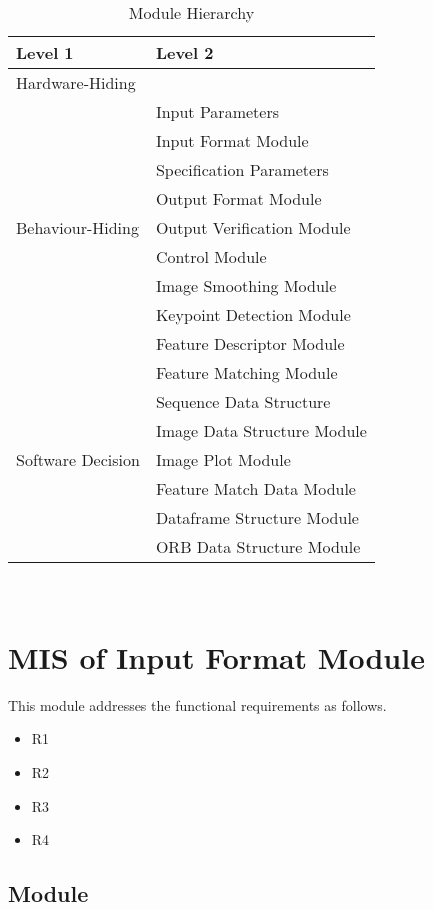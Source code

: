 \documentclass[12pt, titlepage]{article}
\begin{document}
\begin{table}[h!]
\centering
\begin{tabular}{p{} p{}}
\toprule
\textbf{Level 1} & \textbf{Level 2}\\
\midrule

{Hardware-Hiding} & ~ \\
\midrule

\multirow{9}{0.3\textwidth}{Behaviour-Hiding} & Input Parameters\\
& Input Format Module \\
& Specification Parameters \\
& Output Format Module \\
& Output Verification Module \\
& Control Module \\
& Image Smoothing Module \\
& Keypoint Detection Module \\
& Feature Descriptor Module \\
& Feature Matching Module \\
\midrule

\multirow{5}{0.3\textwidth}{Software Decision} & {Sequence Data Structure}\\
& Image Data Structure Module \\
& Image Plot Module \\
& Feature Match Data Module \\
& Dataframe Structure Module \\
& ORB Data Structure Module \\
\bottomrule
 
\end{tabular}
\caption{Module Hierarchy}
\label{TblMH}
\end{table}

\newpage
~\newpage


\section{MIS of Input Format Module} \label{mIF}
This module addresses the functional requirements as follows.
\begin{itemize}
  \item R1
  \item R2
  \item R3
  \item R4
\end{itemize}
\subsection{Module}
\end{document}

